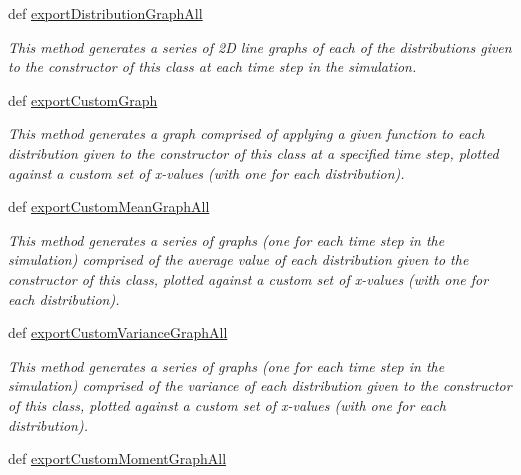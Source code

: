 \begin{DoxyCompactItemize}
def \hyperlink{class_distribution_data_visualiser_1_1_distribution_data_visualiser_ab3c06a75bb9d6eaf77e9b81677473079}{exportDistributionGraphAll}
\begin{DoxyCompactList}\small\item\em This method generates a series of 2D line graphs of each of the distributions given to the constructor of this class at each time step in the simulation. \item\end{DoxyCompactList}\item 
def \hyperlink{class_distribution_data_visualiser_1_1_distribution_data_visualiser_aefcaed410fa6dee06d7b44a5955b0265}{exportCustomGraph}
\begin{DoxyCompactList}\small\item\em This method generates a graph comprised of applying a given function to each distribution given to the constructor of this class at a specified time step, plotted against a custom set of x-\/values (with one for each distribution). \item\end{DoxyCompactList}\item 
def \hyperlink{class_distribution_data_visualiser_1_1_distribution_data_visualiser_acd9f1f9928b666a97c002a6c3afb4550}{exportCustomMeanGraphAll}
\begin{DoxyCompactList}\small\item\em This method generates a series of graphs (one for each time step in the simulation) comprised of the average value of each distribution given to the constructor of this class, plotted against a custom set of x-\/values (with one for each distribution). \item\end{DoxyCompactList}\item 
def \hyperlink{class_distribution_data_visualiser_1_1_distribution_data_visualiser_a1e6dc3d3ece767ef7898c5832b67093d}{exportCustomVarianceGraphAll}
\begin{DoxyCompactList}\small\item\em This method generates a series of graphs (one for each time step in the simulation) comprised of the variance of each distribution given to the constructor of this class, plotted against a custom set of x-\/values (with one for each distribution). \item\end{DoxyCompactList}\item 
def \hyperlink{class_distribution_data_visualiser_1_1_distribution_data_visualiser_aa5bce911364f691982e3c487636b0068}{exportCustomMomentGraphAll}

\end{DoxyCompactItemize}
